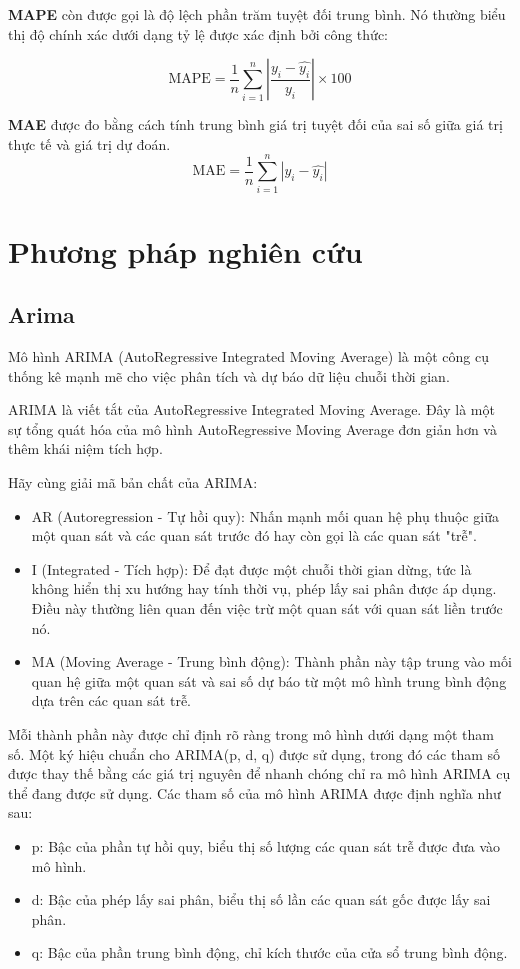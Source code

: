\documentclass[conference]{IEEEtran}
\begin{document}
\textbf{MAPE} còn được gọi là độ lệch phần trăm tuyệt đối trung bình. Nó thường biểu thị độ chính xác dưới dạng tỷ lệ được xác định bởi công thức:

\begin{equation}
    \text{MAPE} = \frac{1}{n} \sum_{i=1}^{n} \left| \frac{y_i - \hat{y_i}}{y_i} \right| \times 100
\end{equation}

\textbf{MAE} được đo bằng cách tính trung bình giá trị tuyệt đối của sai số giữa giá trị thực tế và giá trị dự đoán.
\begin{equation}
    \text{MAE} = \frac{1}{n} \sum_{i=1}^{n} | {y_i - \hat{y_i}}| 
\end{equation}

\section{Phương pháp nghiên cứu}
\subsection{\textbf{Arima}}
Mô hình ARIMA (AutoRegressive Integrated Moving Average) là một công cụ thống kê mạnh mẽ cho việc phân tích và dự báo dữ liệu chuỗi thời gian.

ARIMA là viết tắt của AutoRegressive Integrated Moving Average. Đây là một sự tổng quát hóa của mô hình AutoRegressive Moving Average đơn giản hơn và thêm khái niệm tích hợp.

Hãy cùng giải mã bản chất của ARIMA:
\begin{itemize}
    \item AR (Autoregression - Tự hồi quy): Nhấn mạnh mối quan hệ phụ thuộc giữa một quan sát và các quan sát trước đó hay còn gọi là các quan sát "trễ".

    \item I (Integrated - Tích hợp): Để đạt được một chuỗi thời gian dừng, tức là không hiển thị xu hướng hay tính thời vụ, phép lấy sai phân được áp dụng. Điều này thường liên quan đến việc trừ một quan sát với quan sát liền trước nó.

    \item MA (Moving Average - Trung bình động): Thành phần này tập trung vào mối quan hệ giữa một quan sát và sai số dự báo từ một mô hình trung bình động dựa trên các quan sát trễ.
\end{itemize}
Mỗi thành phần này được chỉ định rõ ràng trong mô hình dưới dạng một tham số. Một ký hiệu chuẩn cho ARIMA(p, d, q) được sử dụng, trong đó các tham số được thay thế bằng các giá trị nguyên để nhanh chóng chỉ ra mô hình ARIMA cụ thể đang được sử dụng.
Các tham số của mô hình ARIMA được định nghĩa như sau:
\begin{itemize}
    \item p: Bậc của phần tự hồi quy, biểu thị số lượng các quan sát trễ được đưa vào mô hình.
    \item d: Bậc của phép lấy sai phân, biểu thị số lần các quan sát gốc được lấy sai phân.
    \item q: Bậc của phần trung bình động, chỉ kích thước của cửa sổ trung bình động.
\end{itemize}
\end{document}
